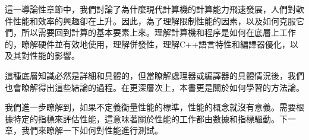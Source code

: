 這一導論性章節中，我們討論了為什麼現代計算機的計算能力飛速發展，人們對軟件性能和效率的興趣卻在上升。因此，為了理解限制性能的因素，以及如何克服它們，所以需要回到計算的基本要素上來。理解計算機和程序是如何在底層上工作的，瞭解硬件並有效地使用，理解併發性，理解C++語言特性和編譯器優化，以及其對性能的影響。

這種底層知識必然是詳細和具體的，但當瞭解處理器或編譯器的具體情況後，我們也會瞭解得出這些結論的過程。在更深層次上，本書更是關於如何學習的方法論。

我們進一步瞭解到，如果不定義衡量性能的標準，性能的概念就沒有意義。需要根據特定的指標來評估性能，這意味著關於性能的工作都由數據和指標驅動。下一章，我們來瞭解一下如何對性能進行測試。